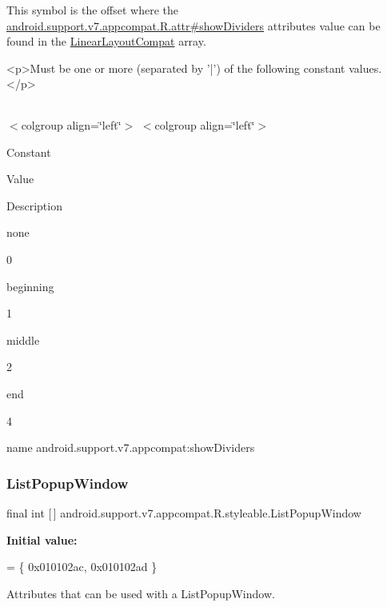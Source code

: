This symbol is the offset where the \hyperlink{classandroid_1_1support_1_1v7_1_1appcompat_1_1R_1_1attr_a7d2a1f3c253160c329280ef49c5a5eba}{android.\+support.\+v7.\+appcompat.\+R.\+attr\#show\+Dividers} attribute\textquotesingle{}s value can be found in the \hyperlink{classandroid_1_1support_1_1v7_1_1appcompat_1_1R_1_1styleable_a765d32873526b8c36de14b184094582d}{Linear\+Layout\+Compat} array.

\begin{DoxyVerb}      <p>Must be one or more (separated by '|') of the following constant values.</p>
\end{DoxyVerb}
 \tabulinesep=1mm
\begin{longtabu} spread 0pt [c]{*{0}{|X[-1]}|}
\hline
\end{longtabu}
$<$colgroup align=\char`\"{}left\char`\"{}$>$ $<$colgroup align=\char`\"{}left\char`\"{}$>$ 

Constant

Value

Description 

{\ttfamily none}

0

{\ttfamily beginning}

1

{\ttfamily middle}

2

{\ttfamily end}

4

name android.\+support.\+v7.\+appcompat\+:show\+Dividers \mbox{\label{classandroid_1_1support_1_1v7_1_1appcompat_1_1R_1_1styleable_a87f1d1e417d9894ead464548553aff2c}} 
\subsubsection{\texorpdfstring{List\+Popup\+Window}{ListPopupWindow}}
{\footnotesize\ttfamily final int \mbox{[}$\,$\mbox{]} android.\+support.\+v7.\+appcompat.\+R.\+styleable.\+List\+Popup\+Window\hspace{0.3cm}{\ttfamily [static]}}

{\bfseries Initial value\+:}
\begin{DoxyCode}
= \{
            0x010102ac, 0x010102ad
        \}
\end{DoxyCode}
Attributes that can be used with a List\+Popup\+Window. 

